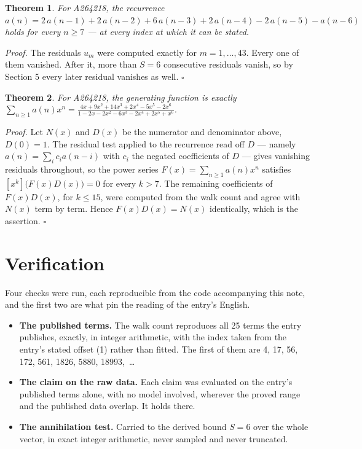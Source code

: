 \documentclass[11pt]{article}
\newtheorem{theorem}{Theorem}
\theoremstyle{definition}
\begin{document}
\begin{theorem} For A264218, the recurrence $a(n) = 2\,a(n-1) + 2\,a(n-2) + 6\,a(n-3) + 2\,a(n-4) - 2\,a(n-5) - a(n-6)$ holds for every $n \ge 7$ --- at every index at which it can be stated.\end{theorem}

{\itshape Proof.} The residuals $u_m$ were computed exactly for $m = 1,\dots,43$. Every one of them vanished. After it, more than $S = 6$ consecutive residuals vanish, so by Section 5 every later residual vanishes as well. $\square$

\begin{theorem} For A264218, the generating function is exactly $\sum_{n\ge 1} a(n)x^n = \frac{4x + 9x^{2} + 14x^{3} + 2x^{4} - 5x^{5} - 2x^{6}}{1 - 2x - 2x^{2} - 6x^{3} - 2x^{4} + 2x^{5} + x^{6}}$.\end{theorem}

{\itshape Proof.} Let $N(x)$ and $D(x)$ be the numerator and denominator above, $D(0)=1$. The residual test applied to the recurrence read off $D$ --- namely $a(n) = \sum_i c_i a(n-i)$ with $c_i$ the negated coefficients of $D$ --- gives vanishing residuals throughout, so the power series $F(x)=\sum_{n\ge 1}a(n)x^n$ satisfies $[x^k]\bigl(F(x)D(x)\bigr) = 0$ for every $k > 7$. The remaining coefficients of $F(x)D(x)$, for $k \le 15$, were computed from the walk count and agree with $N(x)$ term by term. Hence $F(x)D(x) = N(x)$ identically, which is the assertion. $\square$

\section{Verification}

Four checks were run, each reproducible from the code accompanying this note, and the first two are what pin the reading of the entry's English.

\begin{itemize}

\item {\bfseries The published terms.} The walk count reproduces all 25 terms the entry publishes, exactly, in integer arithmetic, with the index taken from the entry's stated offset (1) rather than fitted. The first of them are 4, 17, 56, 172, 561, 1826, 5880, 18993,~\dots

\item {\bfseries The claim on the raw data.} Each claim was evaluated on the entry's published terms alone, with no model involved, wherever the proved range and the published data overlap. It holds there.

\item {\bfseries The annihilation test.} Carried to the derived bound $S = 6$ over the whole vector, in exact integer arithmetic, never sampled and never truncated.

\end{itemize}
\end{document}
